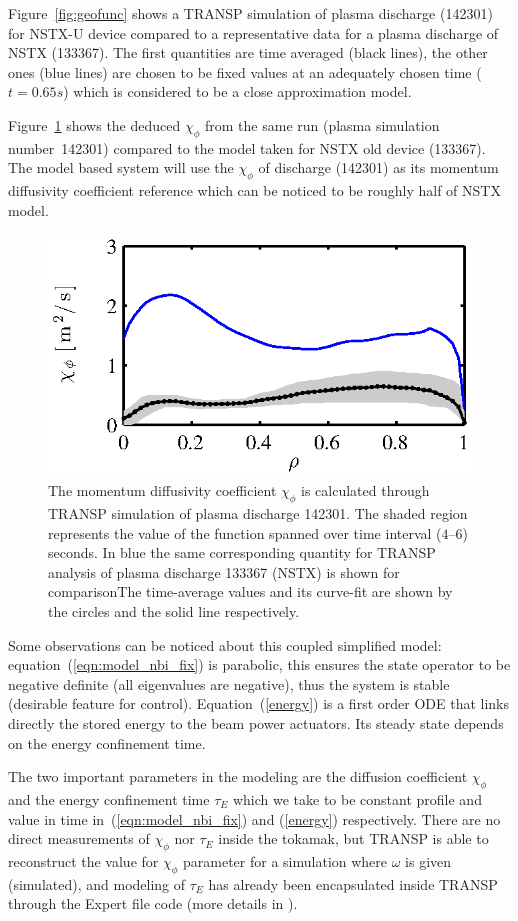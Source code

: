 \documentclass[12pt,lot, lof]{puthesis}
\begin{document}
Figure~{\ref{fig:geofunc}} shows a TRANSP simulation of plasma discharge (142301) for NSTX-U device compared to a representative data for a plasma discharge of NSTX (133367). The first quantities are time averaged (black lines), the other ones (blue lines) are chosen to be  fixed values at an adequately chosen time ($t = 0.65 s$) which is considered to be a close approximation model.

Figure~{\ref{fig:chiphi}} shows the deduced $\chi_\phi$ from the same run (plasma simulation number~142301) compared to the model taken for NSTX old device (133367). The model based system will use the $\chi_\phi$ of discharge (142301) as its momentum diffusivity coefficient reference which can be noticed to be roughly half of NSTX model.

\begin{figure}
\centering
\includegraphics [width=0.7\linewidth]{chap10/fig2_fr}
\caption{The momentum diffusivity coefficient $ \chi_{\phi}$ is calculated through TRANSP simulation of plasma discharge 142301.  The shaded region represents the value of the function spanned over time interval ($4$--$6$) seconds. In blue the same corresponding quantity for TRANSP analysis of plasma discharge 133367 (NSTX) is shown for comparisonThe time-average values and its curve-fit are shown by the circles  and the solid line respectively.}
\label{fig:chiphi}
\end{figure}

Some observations can be noticed about this coupled simplified model: equation~(\ref{eqn:model_nbi_fix}) is parabolic, this ensures the state operator to be negative definite (all eigenvalues are negative), thus the system is stable (desirable feature for control). Equation~(\ref{energy}) is a first order ODE that links directly the stored energy to the beam power actuators. Its steady state depends on the energy confinement time.
  
The two important parameters in the modeling are the diffusion coefficient $\chi_\phi$ and the energy confinement time $\tau_E$ which we
take to be constant profile and value in time in~(\ref{eqn:model_nbi_fix}) and (\ref{energy}) respectively. There are no direct measurements of $\chi_\phi$ nor  $\tau_E$ inside the tokamak, but TRANSP is able to reconstruct the value for $\chi_\phi$ parameter for a simulation where $\omega$
is given (simulated), and modeling of $\tau_E$ has already been encapsulated inside TRANSP through the Expert file code (more details in \cite{Boyer15}).
\end{document}
